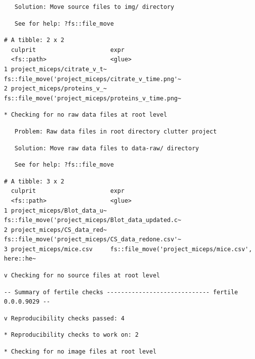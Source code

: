 \documentclass[12pt,twoside]{reedthesis}
\begin{document}
\begin{verbatim}
   Solution: Move source files to img/ directory
\end{verbatim}
\begin{verbatim}
   See for help: ?fs::file_move
\end{verbatim}
\begin{verbatim}
# A tibble: 2 x 2
  culprit                     expr                                              
  <fs::path>                  <glue>                                            
1 project_miceps/citrate_v_t~ fs::file_move('project_miceps/citrate_v_time.png'~
2 project_miceps/proteins_v_~ fs::file_move('project_miceps/proteins_v_time.png~
\end{verbatim}
\begin{verbatim}
* Checking for no raw data files at root level
\end{verbatim}
\begin{verbatim}
   Problem: Raw data files in root directory clutter project
\end{verbatim}
\begin{verbatim}
   Solution: Move raw data files to data-raw/ directory
\end{verbatim}
\begin{verbatim}
   See for help: ?fs::file_move
\end{verbatim}
\begin{verbatim}
# A tibble: 3 x 2
  culprit                     expr                                              
  <fs::path>                  <glue>                                            
1 project_miceps/Blot_data_u~ fs::file_move('project_miceps/Blot_data_updated.c~
2 project_miceps/CS_data_red~ fs::file_move('project_miceps/CS_data_redone.csv'~
3 project_miceps/mice.csv     fs::file_move('project_miceps/mice.csv', here::he~
\end{verbatim}
\begin{verbatim}
v Checking for no source files at root level
\end{verbatim}
\begin{verbatim}
-- Summary of fertile checks ----------------------------- fertile 0.0.0.9029 --
\end{verbatim}
\begin{verbatim}
v Reproducibility checks passed: 4
\end{verbatim}
\begin{verbatim}
* Reproducibility checks to work on: 2
\end{verbatim}
\begin{verbatim}
* Checking for no image files at root level
\end{verbatim}
\end{document}
